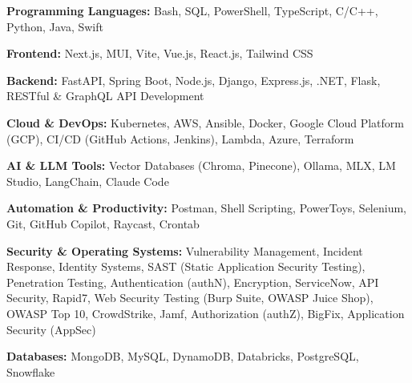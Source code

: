 \textbf{Programming Languages:} Bash, SQL, PowerShell, TypeScript, C/C++, Python, Java, Swift
\vspace{3pt}

\textbf{Frontend:} Next.js, MUI, Vite, Vue.js, React.js, Tailwind CSS
\vspace{3pt}

\textbf{Backend:} FastAPI, Spring Boot, Node.js, Django, Express.js, .NET, Flask, RESTful \& GraphQL API Development
\vspace{3pt}

\textbf{Cloud \& DevOps:} Kubernetes, AWS, Ansible, Docker, Google Cloud Platform (GCP), CI/CD (GitHub Actions, Jenkins), Lambda, Azure, Terraform
\vspace{3pt}

\textbf{AI \& LLM Tools:} Vector Databases (Chroma, Pinecone), Ollama, MLX, LM Studio, LangChain, Claude Code
\vspace{3pt}

\textbf{Automation \& Productivity:} Postman, Shell Scripting, PowerToys, Selenium, Git, GitHub Copilot, Raycast, Crontab
\vspace{3pt}

\textbf{Security \& Operating Systems:} Vulnerability Management, Incident Response, Identity Systems, SAST (Static Application Security Testing), Penetration Testing, Authentication (authN), Encryption, ServiceNow, API Security, Rapid7, Web Security Testing (Burp Suite, OWASP Juice Shop), OWASP Top 10, CrowdStrike, Jamf, Authorization (authZ), BigFix, Application Security (AppSec)
\vspace{3pt}

\textbf{Databases:} MongoDB, MySQL, DynamoDB, Databricks, PostgreSQL, Snowflake